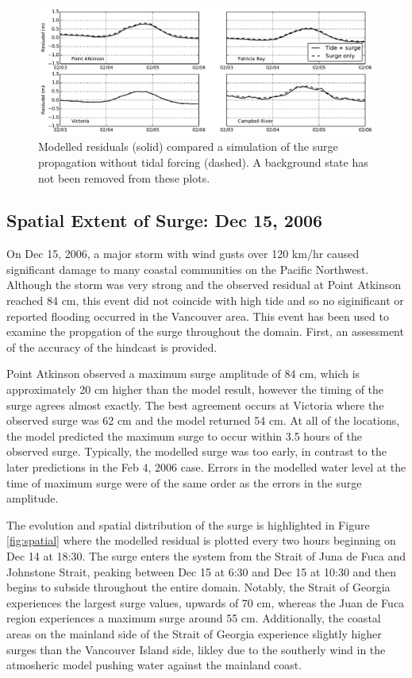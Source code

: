 \documentclass[pdftex,10pt]{article}
\begin{document}
\begin{figure}
\centering
\includegraphics[scale=0.6]{Figures/feb2006_tidesurge.pdf}
\caption{Modelled residuals (solid) compared a simulation of the surge propagation without tidal forcing (dashed). A background state has not been removed from these plots. }
\label{fig:tidesurge}
\end{figure}

\subsection{Spatial Extent of Surge: Dec 15, 2006}
On Dec 15, 2006, a major storm with wind gusts over 120 km/hr caused significant damage to many coastal communities on the Pacific Northwest. Although the storm was very strong and the observed residual at Point Atkinson reached 84 cm, this event did not coincide with high tide and so no siginificant or reported flooding occurred in the Vancouver area\citep{forseth2006adaptation}. This event has been used to examine the propgation of the surge throughout the domain. First, an assessment of the accuracy of the hindcast is provided. 

Point Atkinson observed a maximum surge amplitude of 84 cm, which is approximately 20 cm higher than the model result, however the timing of the surge agrees almost exactly. The best agreement occurs at Victoria where the observed surge was 62 cm and the model returned 54 cm. At all of the locations, the model predicted the maximum surge to occur within 3.5 hours of the observed surge. Typically, the modelled surge was too early, in contrast to the later predictions in the Feb 4, 2006 case. Errors in the modelled water level at the time of maximum surge were of the same order as the errors in the surge amplitude.  

The evolution and spatial distribution of the surge is highlighted in Figure \ref{fig:spatial} where the modelled residual is plotted every two hours beginning on Dec 14 at 18:30. The surge enters the system from the Strait of Juna de Fuca and Johnstone Strait, peaking between Dec 15 at 6:30 and Dec 15 at 10:30 and then begins to subside throughout the entire domain. Notably, the Strait of Georgia experiences the largest surge values, upwards of 70 cm, whereas the Juan de Fuca region experiences a maximum surge around 55 cm. Additionally, the coastal areas on the mainland side of the Strait of Georgia experience slightly higher surges than the Vancouver Island side, likley due to the southerly wind in the atmosheric model pushing water against the mainland coast.  
\end{document}
